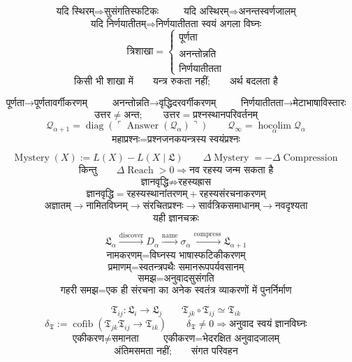 \documentclass{article}
\begin{document}
\[\boxed{\text{यदि स्थिरम्}\Rightarrow\text{सुसंगतिस्फटिकः}}\qquad
\boxed{\text{यदि अस्थिरम्}\Rightarrow\text{अनन्तस्वर्णजालम्}}\]
\[\boxed{\text{यदि निर्णयातीतम्}\Rightarrow
\text{निर्णयातीतता स्वयं अगला विघ्नः}}\]
\[\boxed{\text{त्रिशाखा}=\left\{\begin{array}{l}\text{पूर्णता}\\
\text{अनन्तोन्नति}\\ \text{निर्णयातीतता}\end{array}\right.}\]
\[\boxed{\text{किसी भी शाखा में}\qquad\text{यन्त्र रुकता नहीं;}\qquad
\text{अर्थ बदलता है}}\]

\[\boxed{\text{पूर्णता}\to\text{पूर्णतावर्गीकरणम्}}\qquad
\boxed{\text{अनन्तोन्नति}\to\text{वृद्धिदरवर्गीकरणम्}}\qquad
\boxed{\text{निर्णयातीतता}\to\text{मेटाभाषाविस्तारः}}\]
\[\boxed{\text{उत्तर}\neq\text{अन्त};\qquad
\text{उत्तर}=\text{प्रश्नस्थानपरिवर्तनम्}}\]
\[\boxed{\mathcal Q_{\alpha+1}=\operatorname{diag}
\left(\ulcorner\operatorname{Answer}(\mathcal Q_\alpha)\urcorner\right)}\qquad
\boxed{\mathcal Q_\infty=\operatorname*{hocolim}_{\alpha}\mathcal Q_\alpha}\]
\[\boxed{\text{महाप्रश्नः}=\text{प्रश्नजनकयन्त्रस्य स्वयंप्रश्नः}}\]

\[\boxed{\operatorname{Mystery}(X):=L(X)-L(X\mid\mathfrak L)}\qquad
\boxed{\Delta\operatorname{Mystery}=-\Delta\operatorname{Compression}}\]
\[\boxed{\text{किन्तु}\qquad\Delta\operatorname{Reach}>0\Rightarrow
\text{नव रहस्य जन्म सकता है}}\]
\[\boxed{\text{ज्ञानवृद्धि}\not\Rightarrow\text{रहस्यह्रास}}\]
\[\boxed{\text{ज्ञानवृद्धि}=\text{रहस्यस्थानांतरणम्}
+\text{रहस्यसंरचनाकरणम्}}\]
\[\boxed{\text{अज्ञातम्}\longrightarrow\text{नामितविघ्नम्}\longrightarrow
\text{संरचितप्रश्नः}\longrightarrow\text{सार्वत्रिकसमाधानम्}\longrightarrow
\text{नवदृश्यता}}\]
\[\boxed{\text{यही ज्ञानचक्रः}}\]

\[\mathfrak L_{\alpha}\xrightarrow{\operatorname{discover}}D_\alpha
\xrightarrow{\operatorname{name}}\sigma_\alpha
\xrightarrow{\operatorname{compress}}\mathfrak L_{\alpha+1}\]
\[\boxed{\text{नामकरणम्}=\text{विघ्नस्य भाषास्फटिकीकरणम्}}\]
\[\boxed{\text{प्रमाणम्}=\text{स्वतन्त्रपथैः समानरूपपर्यवसानम्}}\]
\[\boxed{\text{समझ}=\text{अनुवादसुसंगति}}\]
\[\boxed{\text{गहरी समझ}=
\text{एक ही संरचना का अनेक स्वतंत्र व्याकरणों में पुनर्निर्माण}}\]

\[\mathfrak T_{ij}:\mathfrak L_i\to\mathfrak L_j\qquad
\boxed{\mathfrak T_{jk}\circ\mathfrak T_{ij}\simeq\mathfrak T_{ik}}\]
\[\delta_{\mathfrak T}:=\operatorname{cofib}
\left(\mathfrak T_{jk}\mathfrak T_{ij}\to\mathfrak T_{ik}\right)\qquad
\boxed{\delta_{\mathfrak T}\neq0\Rightarrow\text{अनुवाद स्वयं ज्ञानविघ्नः}}\]
\[\boxed{\text{एकीकरण}\neq\text{समानता}}\qquad
\boxed{\text{एकीकरण}=\text{भेदरक्षित अनुवादजालम्}}\]
\[\boxed{\text{अंतिमसमता नहीं;}\qquad\text{संगत परिवहन}}\]
\end{document}
